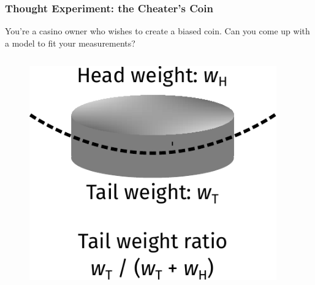 \documentclass[10pt,aspectratio=169]{beamer}
\begin{document}
\begin{frame}
  \frametitle{Thought Experiment: the Cheater’s Coin}
  
  You're a casino owner who wishes to create a biased coin. Can you
  come up with a model to fit your measurements?

  \vfill
  \begin{columns}
    \begin{column}{0.25\textwidth}
      \begin{figure}[t]
        \centering \includegraphics[width=\textwidth]{images/coin.pdf}
      \end{figure}
    \end{column}
    \begin{column}{0.75\textwidth}
    \end{column}
  \end{columns}

\end{frame}
\end{document}

